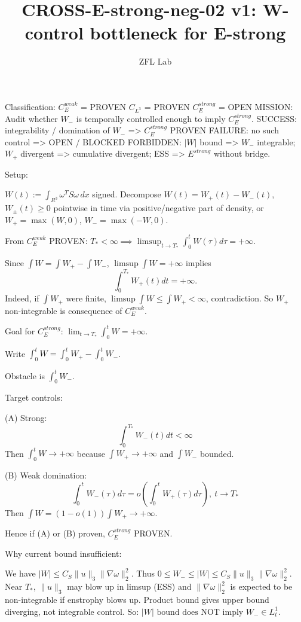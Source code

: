 \documentclass[11pt]{article}
\title{CROSS-E-strong-neg-02 v1: W- control bottleneck for E-strong}
\author{ZFL Lab}
\begin{document}
\maketitle

Classification:
$C_E^{weak}$ = PROVEN
$C_{L^3}$ = PROVEN
$C_E^{strong}$ = OPEN
MISSION: Audit whether $W_-$ is temporally controlled enough to imply $C_E^{strong}$.
SUCCESS: integrability / domination of $W_-$ => $C_E^{strong}$ PROVEN
FAILURE: no such control => OPEN / BLOCKED
FORBIDDEN: $|W|$ bound => $W_-$ integrable; $W_+$ divergent => cumulative divergent; ESS => $E^{strong}$ without bridge.

Setup:

$W(t):=\int_{R^3}\omega^T S\omega\,dx$ signed.
Decompose $W(t)=W_+(t)-W_-(t)$, $W_\pm(t)\ge0$ pointwise in time via positive/negative part of density, or $W_+=\max(W,0)$, $W_-=\max(-W,0)$.

From $C_E^{weak}$ PROVEN:
$T_*<\infty \implies \limsup_{t\to T_*}\int_0^t W(\tau)d\tau = +\infty$.

Since $\int W = \int W_+ - \int W_-$,
$\limsup\int W = +\infty$ implies
\begin{equation*}
\int_0^{T_*} W_+(t)dt = +\infty.
\end{equation*}
Indeed, if $\int W_+$ were finite, $\limsup\int W\le \int W_+ <\infty$, contradiction. So $W_+$ non-integrable is consequence of $C_E^{weak}$.

Goal for $C_E^{strong}$:
$\lim_{t\to T_*}\int_0^t W = +\infty$.

Write $\int_0^t W = \int_0^t W_+ - \int_0^t W_-$.

Obstacle is $\int_0^t W_-$.

Target controls:

(A) Strong:
\begin{equation*}
\boxed{\int_0^{T_*} W_-(t)dt <\infty}
\end{equation*}
Then $\int_0^t W \to +\infty$ because $\int W_+\to+\infty$ and $\int W_-$ bounded.

(B) Weak domination:
\begin{equation*}
\boxed{\int_0^t W_-(\tau)d\tau = o\!\left(\int_0^t W_+(\tau)d\tau\right),\ t\to T_*}
\end{equation*}
Then $\int W = (1-o(1))\int W_+ \to +\infty$.

Hence if (A) or (B) proven, $C_E^{strong}$ PROVEN.

Why current bound insufficient:

We have $|W|\le C_S\|u\|_3\|\nabla\omega\|_2^2$.
Thus $0\le W_-\le |W|\le C_S\|u\|_3\|\nabla\omega\|_2^2$.
Near $T_*$, $\|u\|_3$ may blow up in limsup (ESS) and $\|\nabla\omega\|_2^2$ is expected to be non-integrable if enstrophy blows up. Product bound gives upper bound diverging, not integrable control.
So:
$\boxed{|W|\text{ bound does NOT imply }W_-\in L^1_t}$.
\end{document}
